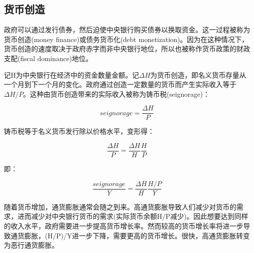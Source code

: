 \documentclass{article}
\begin{document}
\subsection{货币创造}

政府可以通过发行债券，然后迫使中央银行购买债券以换取资金。这一过程被称为货币创造(money finance)或债务货币化(debt monetization)。因为在这种情况下，货币创造的速度取决于政府赤字而非中央银行地位，所以也被称作货币政策的财政支配(fiscal dominance)地位。

记H为中央银行在经济中的资金数量金额。记$ \Delta H $为货币创造，即名义货币存量从一个月到下一个月的变化。政府通过创造一定数量的货币而产生实际收入等于$ \Delta H/P $。这种由货币创造带来的实际收入被称为铸币税(seignorage)：

\[
seignorage=\frac{\Delta H}{P}
\]

铸币税等于名义货币发行除以价格水平，变形得：

\[
\frac{\Delta H}{P}=\frac{\Delta H}{H}\frac{H}{P}
\]

即：

\[
\frac{seignorage}{Y}=\frac{\Delta H}{H}\frac{H/P}{Y}
\]

随着货币增加，通货膨胀通常会随之到来。高通货膨胀导致人们减少对货币的需求，进而减少对中央银行货币的需求(实际货币余额H/P减少)。因此想要达到同样的收入水平，政府需要进一步提高货币增长率。然而较高的货币增长率将进一步导致通货膨胀，(H/P)/Y进一步下降，需要更高的货币增长。很快，高通货膨胀转变为恶行通货膨胀。








































	
\end{document}
